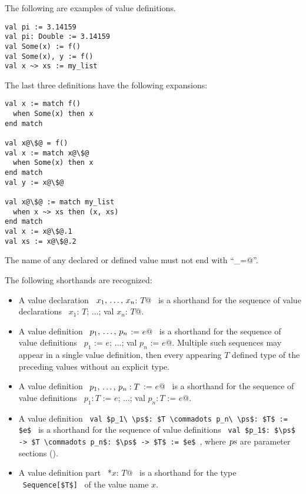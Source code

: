 \example The following are examples of value definitions. 
\begin{lstlisting}
val pi := 3.14159
val pi: Double := 3.14159
val Some(x) := f() 
val Some(x), y := f()
val x ~> xs := my_list
\end{lstlisting}

The last three definitions have the following expansions:
\begin{lstlisting}[escapechar=@]
val x := match f()
  when Some(x) then x
end match

val x@\$@ = f()
val x := match x@\$@
  when Some(x) then x
end match
val y := x@\$@

val x@\$@ := match my_list
  when x ~> xs then (x, xs)
end match
val x := x@\$@.1
val xs := x@\$@.2
\end{lstlisting}

The name of any declared or defined value must not end with ``\lstinline@_=@''. 

The following shorthands are recognized: 
\begin{itemize}
  \item[] A value declaration ~\lstinline@val $x_1 ,\, \ldots ,\, x_n$: $T$@~ is a shorthand for the sequence of value declarations ~\lstinline@val $x_1$: $T$; $\ldots$; val $x_n$: $T$@. 

  \item[] A value definition ~\lstinline@val $p_1 ,\, \ldots ,\, p_n$ := $e$@~ is a shorthand for the sequence of value definitions ~\lstinline@val $p_1$ := $e$; $\ldots$; val $p_n$ := $e$@. Multiple such sequences may appear in a single value definition, then every appearing $T$ defined type of the preceding values without an explicit type. 

  \item[] A value definition ~\lstinline@val $p_1 ,\, \ldots ,\, p_n: T$ := $e$@~ is a shorthand for the sequence of value definitions ~\lstinline@val $p_1: T$ := $e$; $\ldots$; val $p_n: T$ := $e$@.

  \item[] A value definition ~\lstinline!val $p_1\ \ps$: $T \commadots p_n\ \ps$: $T$ := $e$!~ is a shorthand for the sequence of value definitions ~\lstinline!val $p_1$: $\ps$ -> $T \commadots p_n$: $\ps$ -> $T$ := $e$!~, where $\mbox{\sl ps}$ are parameter sections ().

  \item[] A value definition part ~\lstinline@*$x$: $T$@~ is a shorthand for the type ~\lstinline!Sequence[$T$]!~ of the value name $x$. 
\end{itemize}






